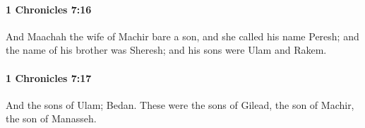 		\paragraph{1 Chronicles 7:16} %
			\label{1CHRONICLES-7-16}

			And Maachah the wife of Machir bare a son, and she called his name Peresh; and the name of his brother was Sheresh; and his sons were Ulam and Rakem.


		\paragraph{1 Chronicles 7:17} %
			\label{1CHRONICLES-7-17}

			And the sons of Ulam; Bedan. These were the sons of Gilead, the son of Machir, the son of Manasseh.


